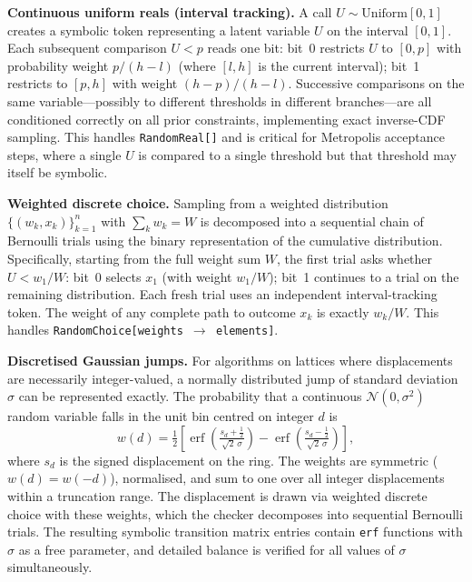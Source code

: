 \documentclass[twocolumn,10pt]{article}
\begin{document}
\smallskip\noindent\textbf{Continuous uniform reals (interval tracking).}
A call $U\sim\mathrm{Uniform}[0,1]$ creates a symbolic token representing a
latent variable $U$ on the interval $[0,1]$.  Each subsequent comparison $U
< p$ reads one bit: bit~0 restricts $U$ to $[0,p]$ with probability weight
$p/(h-l)$ (where $[l,h]$ is the current interval); bit~1 restricts to
$[p,h]$ with weight $(h-p)/(h-l)$.  Successive comparisons on the same
variable---possibly to different thresholds in different branches---are all
conditioned correctly on all prior constraints, implementing exact
inverse-CDF sampling.  This handles \texttt{RandomReal[]} and is critical
for Metropolis acceptance steps, where a single $U$ is compared to a single
threshold but that threshold may itself be symbolic.

\smallskip\noindent\textbf{Weighted discrete choice.}
Sampling from a weighted distribution
$\{(w_k, x_k)\}_{k=1}^n$ with $\sum_k w_k = W$ is decomposed into a
sequential chain of Bernoulli trials using the binary representation of the
cumulative distribution.  Specifically, starting from the full weight sum
$W$, the first trial asks whether $U < w_1/W$: bit~0 selects $x_1$ (with
weight $w_1/W$); bit~1 continues to a trial on the remaining distribution.
Each fresh trial uses an independent interval-tracking token.  The weight of
any complete path to outcome $x_k$ is exactly $w_k/W$.  This handles
\texttt{RandomChoice[weights $\to$ elements]}.

\smallskip\noindent\textbf{Discretised Gaussian jumps.}
For algorithms on lattices where displacements are necessarily integer-valued,
a normally distributed jump of standard deviation $\sigma$ can be represented
exactly.  The probability that a continuous $\mathcal{N}(0,\sigma^2)$ random
variable falls in the unit bin centred on integer $d$ is
\begin{equation}
  w(d) = \tfrac{1}{2}\!\left[\operatorname{erf}\!\left(\tfrac{s_d+\frac{1}{2}}{\sqrt{2}\,\sigma}\right)
  - \operatorname{erf}\!\left(\tfrac{s_d-\frac{1}{2}}{\sqrt{2}\,\sigma}\right)\right],
  \label{eq:normalbin}
\end{equation}
where $s_d$ is the signed displacement on the ring.  The weights are
symmetric ($w(d)=w(-d)$), normalised, and sum to one over all integer
displacements within a truncation range.  The displacement is drawn via
weighted discrete choice with these weights, which the checker decomposes
into sequential Bernoulli trials.  The resulting symbolic transition matrix
entries contain \texttt{erf} functions with $\sigma$ as a free parameter, and
detailed balance is verified for all values of $\sigma$ simultaneously.
\end{document}

